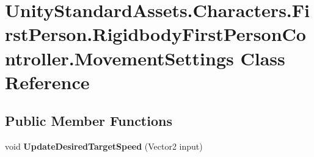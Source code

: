 \hypertarget{class_unity_standard_assets_1_1_characters_1_1_first_person_1_1_rigidbody_first_person_controller_1_1_movement_settings}{}\section{Unity\+Standard\+Assets.\+Characters.\+First\+Person.\+Rigidbody\+First\+Person\+Controller.\+Movement\+Settings Class Reference}
\label{class_unity_standard_assets_1_1_characters_1_1_first_person_1_1_rigidbody_first_person_controller_1_1_movement_settings}
\subsection*{Public Member Functions}
\begin{DoxyCompactItemize}
\item 
\mbox{\label{class_unity_standard_assets_1_1_characters_1_1_first_person_1_1_rigidbody_first_person_controller_1_1_movement_settings_ae7d0b6e44e887e968868498f510d816d}} 
void {\bfseries Update\+Desired\+Target\+Speed} (Vector2 input)
\end{DoxyCompactItemize}
